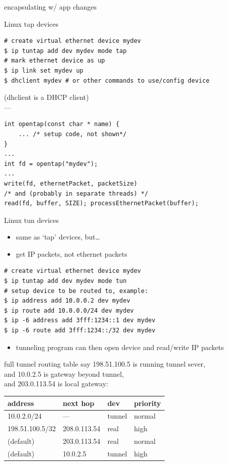 \begin{frame}[label=encapChanges]{encapsulating w/ app changes}
\begin{frame}[fragile]{Linux tap devices}
\begin{Verbatim}[fontsize=\fontsize{10}{11}]
# create virtual ethernet device mydev
$ ip tuntap add dev mydev mode tap
# mark ethernet device as up
$ ip link set mydev up
$ dhclient mydev # or other commands to use/config device
\end{Verbatim}
(dhclient is a DHCP client) \\
---
\begin{Verbatim}[fontsize=\fontsize{10}{11}]
int opentap(const char * name) {
    ... /* setup code, not shown*/
}
...
int fd = opentap("mydev");
...
write(fd, ethernetPacket, packetSize)
/* and (probably in separate threads) */
read(fd, buffer, SIZE); processEthernetPacket(buffer);
\end{Verbatim}
\end{frame}


\begin{frame}[fragile]{Linux tun devices}
    \begin{itemize}
    \item same as `tap' devices, but\ldots
    \item get IP packets, not ethernet packets
    \end{itemize}
\begin{Verbatim}[fontsize=\fontsize{10}{11}]
# create virtual ethernet device mydev
$ ip tuntap add dev mydev mode tun
# setup device to be routed to, example:
$ ip address add 10.0.0.2 dev mydev
$ ip route add 10.0.0.0/24 dev mydev
$ ip -6 address add 3fff:1234::1 dev mydev
$ ip -6 route add 3fff:1234::/32 dev mydev
\end{Verbatim}
    \begin{itemize}
    \item tunneling program can then open device and read/write IP packets
    \end{itemize}
\end{frame}

\begin{frame}[fragile]{full tunnel routing table}
say 198.51.100.5 is running tunnel sever, \\
and 10.0.2.5  is gateway beyond tunnel, \\
and 203.0.113.54 is local gateway: \\
\begin{tabular}{l|l|l|l}
address & next hop & dev & priority\\ \hline
10.0.2.0/24 & --- & tunnel & normal \\
198.51.100.5/32 & 208.0.113.54 & real & high\\
(default) & 203.0.113.54 & real & normal \\
(default) & 10.0.2.5 & tunnel & high \\
\end{tabular}
\end{frame}



\end{frame}
